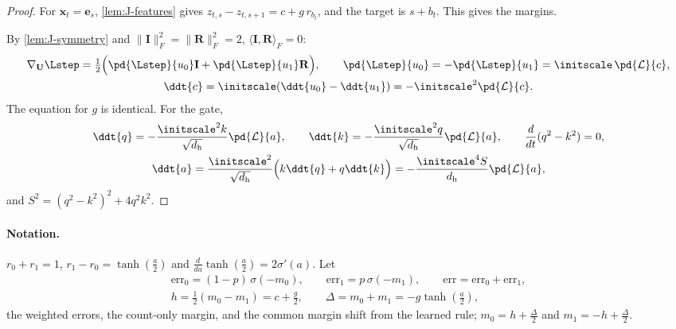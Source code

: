\begin{proof}
For $\bm x_t=\bm e_s$, \cref{lem:J-features} gives $z_{t,s}-z_{t,s+1}=c+g\,r_{b_t}$, and the target is $s+b_t$. This gives the margins.

By \cref{lem:J-symmetry} and $\|\mathbf I\|_F^2=\|\mathbf R\|_F^2=2$, $\langle\mathbf I,\mathbf R\rangle_F=0$:
\begin{gather*}
 \nabla_{\mathbf U}\Lstep=\tfrac{1}{2}\Bigl(\pd{\Lstep}{u_0}\mathbf I+\pd{\Lstep}{u_1}\mathbf R\Bigr),\qquad \pd{\Lstep}{u_0}=-\pd{\Lstep}{u_1}=\initscale\, \pd{\mathcal L}{c},\\
 \ddt{c}=\initscale(\ddt{u_0}-\ddt{u_1})=-\initscale^2 \pd{\mathcal L}{c} .
\end{gather*}
The equation for $g$ is identical. For the gate,
\begin{gather*}
 \ddt{q}=-\frac{\initscale^2k}{\sqrt{d_{\mathrm h}}}\pd{\mathcal L}{a},\qquad \ddt{k}=-\frac{\initscale^2q}{\sqrt{d_{\mathrm h}}}\pd{\mathcal L}{a},\qquad \frac{d}{dt}(q^2-k^2)=0,\\
 \ddt{a}=\frac{\initscale^2}{\sqrt{d_{\mathrm h}}}\Bigl(k\ddt{q}+q\ddt{k}\Bigr)=-\frac{\initscale^4S}{d_{\mathrm h}}\pd{\mathcal L}{a},
\end{gather*}
and $S^2=(q^2-k^2)^2+4q^2k^2$.
\end{proof}

\paragraph{Notation.} $r_0+r_1=1$, $r_1-r_0=\tanh(\frac{a}{2})$ and $\frac{d}{da}\tanh(\frac{a}{2})=2\sigma'(a)$. Let
\begin{gather*}
 \mathrm{err}_0=(1-p)\,\sigma(-m_0),\qquad \mathrm{err}_1=p\,\sigma(-m_1),\qquad \mathrm{err}=\mathrm{err}_0+\mathrm{err}_1,\\
 h=\tfrac{1}{2}(m_0-m_1)=c+\tfrac{g}{2},\qquad \Delta=m_0+m_1=-g\tanh(\frac{a}{2}),
\end{gather*}
the weighted errors, the count-only margin, and the common margin shift from the learned rule; $m_0=h+\frac{\Delta}{2}$ and
$m_1=-h+\frac{\Delta}{2}$.

